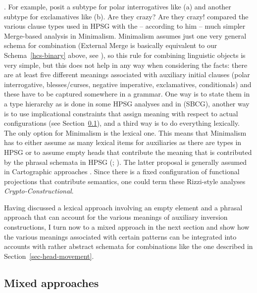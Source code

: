\documentclass[output=paper
                ,modfonts
                ,nonflat
	        ,collection
	        ,collectionchapter
	        ,collectiontoclongg
 	        ,biblatex
                ,babelshorthands
                ,newtxmath
                ,draftmode
                ,colorlinks, citecolor=brown
]{./langsci/langscibook}
\begin{document}
. For example, \citet[]{Sag2020a} posit a subtype  for polar
interrogatives like (a) and another subtype  for exclamatives like (b).
\eal
\ex Are they crazy?
\ex Are they crazy!
\zl
\citet{Chomsky2010a} compared the various clause types used in HPSG with the -- according to him --
much simpler Merge-based analysis in Minimalism. Minimalism assumes just one very general schema for
combination (External Merge is basically equivalent to our Schema~\ref{hcs-binary} above, see
), so this rule for combining linguistic objects is very simple, but this
does not help in any way when considering the facts: there are at least five different meanings
associated with auxiliary initial clauses (polar interrogative, blesses/curses, negative imperative,
exclamatives, conditionals) and these have to be captured somewhere in a grammar. One
way is to state them in a type hierarchy as is done in some HPSG analyses and in \sbcg (SBCG), another way
is to use implicational constraints that assign meaning with respect to actual configurations
(see Section~\ref{sec-mixed-approaches}), and a third way is to do everything lexically. The only option for
Minimalism is the lexical one. This means that Minimalism has to either assume as many lexical items
for auxiliaries as there are types in HPSG or to assume empty heads that contribute the meaning that
is contributed by the phrasal schemata in HPSG (\citealp[Section~5]{Borsley2006a}; ). 
The latter proposal is generally assumed in
Cartographic approaches \citep{Rizzi97a-u}. Since there is a fixed configuration of functional projections
that contribute semantics, one could term these Rizzi-style analyses \emph{Crypto-Constructional}.

Having discussed a lexical approach involving an empty element and a phrasal approach that can
account for the various meanings of auxiliary inversion constructions, I turn now to a mixed
approach in the next section and show how the various meanings associated with certain patterns can
be integrated into accounts with rather abstract schemata for combinations like the one described in
Section~\ref{sec-head-movement}.

\subsection{Mixed approaches}
\label{sec-mixed-approaches}
\end{document}
